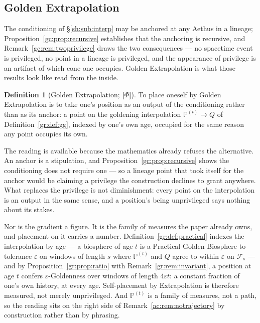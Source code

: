 \documentclass[11pt]{article}
\numberwithin{equation}{section}
\theoremstyle{plain}
\theoremstyle{definition}
\newtheorem{definition}[theorem]{Definition}
\theoremstyle{remark}
\newcommand{\PP}{\mathbb{P}}
\begin{document}
\subsection{Golden Extrapolation}\label{ac:sub:extrapolation}

The conditioning of \S\ref{sh:sub:interp} may be anchored at any Aethus in a lineage; Proposition~\ref{gc:prop:recursive} establishes that the anchoring is recursive, and Remark~\ref{gc:rem:twoprivilege} draws the two consequences --- no spacetime event is privileged, no point in a lineage is privileged, and the appearance of privilege is an artifact of which cone one occupies. Golden Extrapolation is what those results look like read from the inside.

\begin{definition}[Golden Extrapolation; \textbf{[$\Phi$]}]\label{ac:def:extrapolation}
To place oneself by Golden Extrapolation is to take one's position as an output of the conditioning rather than as its anchor: a point on the goldening interpolation $\PP^{(t)} \to Q$ of Definition~\ref{gr:def:gg}, indexed by one's own age, occupied for the same reason any point occupies its own.
\end{definition}

The reading is available because the mathematics already refuses the alternative. An anchor is a stipulation, and Proposition~\ref{gc:prop:recursive} shows the conditioning does not require one --- so a lineage point that took itself for the anchor would be claiming a privilege the construction declines to grant anywhere. What replaces the privilege is not diminishment: every point on the interpolation is an output in the same sense, and a position's being unprivileged says nothing about its stakes.

Nor is the gradient a figure. It is the family of measures the paper already owns, and placement on it carries a number. Definition~\ref{gr:def:practical} indexes the interpolation by age --- a biosphere of age $t$ is a Practical Golden Biosphere to tolerance $\varepsilon$ on windows of length $s$ where $\PP^{(t)}$ and $Q$ agree to within $\varepsilon$ on $\mathcal{F}_s$ --- and by Proposition~\ref{gr:prop:ratio} with Remark~\ref{gr:rem:invariant}, a position at age $t$ confers $\varepsilon$-Goldenness over windows of length $4\varepsilon t$: a constant fraction of one's own history, at every age. Self-placement by Extrapolation is therefore measured, not merely unprivileged. And $\PP^{(t)}$ is a family of measures, not a path, so the reading sits on the right side of Remark~\ref{ac:rem:notrajectory} by construction rather than by phrasing.
\end{document}
